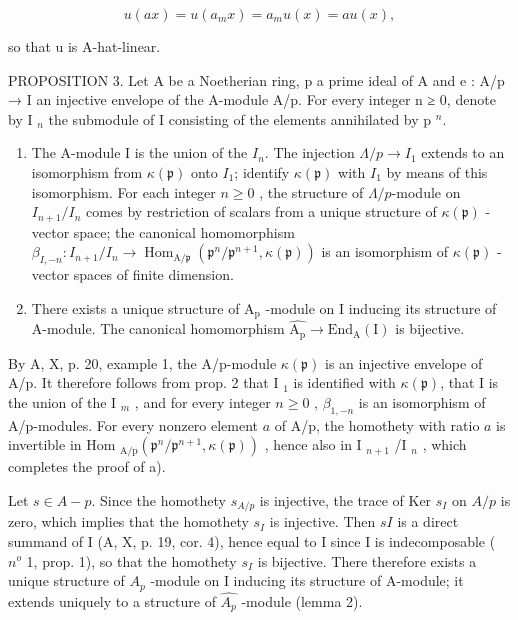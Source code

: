 \[
u (a x) = u \left(a _ {m} x\right) = a _ {m} u (x) = a u (x),
\]

so that u is A-hat-linear.

PROPOSITION 3. Let A be a Noetherian ring, p a prime ideal of A and e : A/p → I an injective envelope of the A-module A/p. For every integer n ≥ 0, denote by I \(_{n}\) the submodule of I consisting of the elements annihilated by p \(^{n}\).

\begin{enumerate}
\def\labelenumi{\alph{enumi})}
\item
  The A-module I is the union of the \(I_{n}\). The injection \(\Lambda/p \to I_{1}\) extends to an isomorphism from \(\kappa(\mathfrak{p})\) onto \(I_{1}\); identify \(\kappa(\mathfrak{p})\) with \(I_{1}\) by means of this isomorphism. For each integer \(n \geqslant 0\) , the structure of \(\Lambda/p\)-module on \(I_{n+1}/I_{n}\) comes by restriction of scalars from a unique structure of \(\kappa(\mathfrak{p})\) -vector space; the canonical homomorphism \(\beta_{I,-n}: I_{n+1}/I_{n} \longrightarrow \operatorname{Hom}_{\mathrm{A}/\mathfrak{p}}(\mathfrak{p}^{n}/\mathfrak{p}^{n+1}, \kappa(\mathfrak{p}))\) is an isomorphism of \(\kappa(\mathfrak{p})\) -vector spaces of finite dimension.
\item
  There exists a unique structure of \(\mathrm{A_p}\) -module on I inducing its structure of A-module. The canonical homomorphism \(\widehat{\mathrm{A_p}} \longrightarrow \mathrm{End}_{\mathrm{A}}(\mathrm{I})\) is bijective.
\end{enumerate}

By A, X, p. 20, example 1, the A/p-module \(\kappa(\mathfrak{p})\) is an injective envelope of A/p. It therefore follows from prop. 2 that I \(_1\) is identified with \(\kappa(\mathfrak{p})\), that I is the union of the I \(_m\) , and for every integer \(n \geqslant 0\) , \(\beta_{1,-n}\) is an isomorphism of A/p-modules. For every nonzero element \(a\) of A/p, the homothety with ratio \(a\) is invertible in Hom \(_{\text{A/p}}(\mathfrak{p}^n/\mathfrak{p}^{n+1}, \kappa(\mathfrak{p}))\) , hence also in I \(_{n+1}\) /I \(_n\) , which completes the proof of a).

Let \(s \in A - p\). Since the homothety \(s_{A/p}\) is injective, the trace of Ker \(s_I\) on \(A/p\) is zero, which implies that the homothety \(s_I\) is injective. Then \(sI\) is a direct summand of I (A, X, p. 19, cor. 4), hence equal to I since I is indecomposable ( \(n^o\) 1, prop. 1), so that the homothety \(s_I\) is bijective. There therefore exists a unique structure of \(A_p\) -module on I inducing its structure of A-module; it extends uniquely to a structure of \(\widehat{A_p}\) -module (lemma 2).

